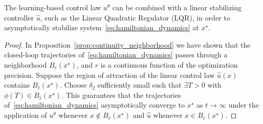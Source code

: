\begin{prop}


    The learning-based \idapbc{} control law $u^\theta$ can be combined with a
    linear stabilizing controller $\hat{u}$, such as the Linear Quadratic
    Regulator (LQR), in order to asymptotically stabilize
    system~\eqref{eq:hamiltonian_dynamics} at $x^\star$.
\end{prop}

\begin{proof}
    In Proposition~\ref{prop:continuity_neighborhood} we have shown that the
    closed-loop trajectories of~\eqref{eq:hamiltonian_dynamics} passes through
    a neighborhood $B_{r}(x^\star)$, and $r$ is a continuous function of the
    optimization precision.
    Suppose the region of attraction of the linear control law $\hat{u}(x)$
    contains $B_{\hat{r}}(x^\star)$. 
    Choose $\delta_2$ sufficiently small such that $\exists T > 0$ with
    $\phi(T) \in B_{\hat{r}}(x^\star)$. 
    This guarantees that the trajectories of~\eqref{eq:hamiltonian_dynamics}
    asymptotically converge to $x^\star$ as $t \to \infty$ under the application
    of $u^\theta$ whenever $x \not\in B_{\hat{r}}(x^\star)$ and $\hat{u}$ whenever $x
    \in B_{\hat{r}}(x^\star)$.
\end{proof}


